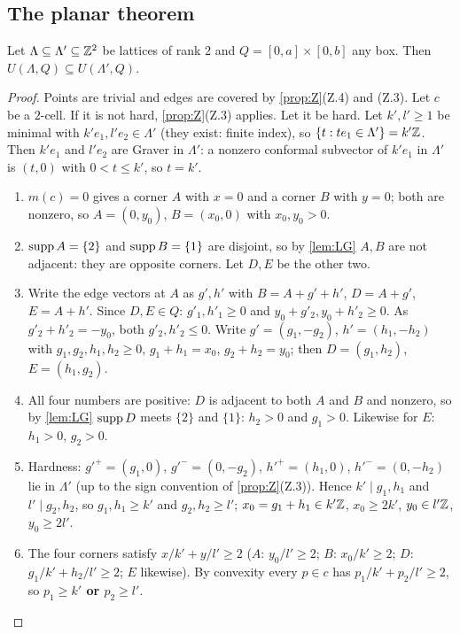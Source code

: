 \subsection{The planar theorem}\label{sec:p5p1}
\begin{theorem}\label{thm:planar}
Let $\Lambda\subseteq\Lambda'\subseteq\mathbb Z^2$ be lattices of rank $2$ and $Q=[0,a]\times[0,b]$ any box. Then $U(\Lambda,Q)\subseteq U(\Lambda',Q)$.
\end{theorem}
\begin{proof}
Points are trivial and edges are covered by \cref{prop:Z}(Z.4) and (Z.3). Let $c$ be a $2$-cell. If it is not hard, \cref{prop:Z}(Z.3) applies. Let it be hard. Let $k',l'\ge1$ be minimal with $k'e_1,l'e_2\in\Lambda'$ (they exist: finite index), so $\{t:te_1\in\Lambda'\}=k'\mathbb Z$. Then $k'e_1$ and $l'e_2$ are Graver in $\Lambda'$: a nonzero conformal subvector of $k'e_1$ in $\Lambda'$ is $(t,0)$ with $0<t\le k'$, so $t=k'$.
\begin{enumerate}[label=(\arabic*),leftmargin=*]
\item $m(c)=0$ gives a corner $A$ with $x=0$ and a corner $B$ with $y=0$; both are nonzero, so $A=(0,y_0)$, $B=(x_0,0)$ with $x_0,y_0>0$.
\item $\operatorname{supp} A=\{2\}$ and $\operatorname{supp} B=\{1\}$ are disjoint, so by \cref{lem:LG} $A,B$ are not adjacent: they are opposite corners. Let $D,E$ be the other two.
\item Write the edge vectors at $A$ as $g',h'$ with $B=A+g'+h'$, $D=A+g'$, $E=A+h'$. Since $D,E\in Q$: $g'_1,h'_1\ge0$ and $y_0+g'_2,y_0+h'_2\ge0$. As $g'_2+h'_2=-y_0$, both $g'_2,h'_2\le0$. Write $g'=(g_1,-g_2)$, $h'=(h_1,-h_2)$ with $g_1,g_2,h_1,h_2\ge0$, $g_1+h_1=x_0$, $g_2+h_2=y_0$; then $D=(g_1,h_2)$, $E=(h_1,g_2)$.
\item All four numbers are positive: $D$ is adjacent to both $A$ and $B$ and nonzero, so by \cref{lem:LG} $\operatorname{supp} D$ meets $\{2\}$ and $\{1\}$: $h_2>0$ and $g_1>0$. Likewise for $E$: $h_1>0$, $g_2>0$.
\item Hardness: $g'^{+}=(g_1,0)$, $g'^-=(0,-g_2)$, $h'^+=(h_1,0)$, $h'^-=(0,-h_2)$ lie in $\Lambda'$ (up to the sign convention of \cref{prop:Z}(Z.3)). Hence $k'\mid g_1,h_1$ and $l'\mid g_2,h_2$, so $g_1,h_1\ge k'$ and $g_2,h_2\ge l'$; $x_0=g_1+h_1\in k'\mathbb Z$, $x_0\ge2k'$, $y_0\in l'\mathbb Z$, $y_0\ge2l'$.
\item The four corners satisfy $x/k'+y/l'\ge2$ ($A$: $y_0/l'\ge2$; $B$: $x_0/k'\ge2$; $D$: $g_1/k'+h_2/l'\ge2$; $E$ likewise). By convexity every $p\in c$ has $p_1/k'+p_2/l'\ge2$, so \textbf{$p_1\ge k'$ or $p_2\ge l'$}.

\end{enumerate}
\end{proof}
